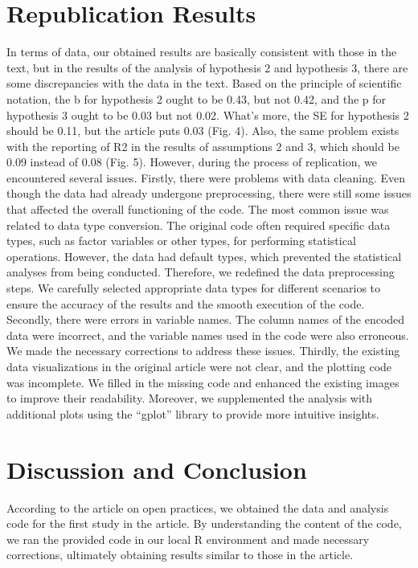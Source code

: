 \documentclass[
  man]{apa6}
\begin{document}
\hypertarget{republication-results}{%
\section{Republication Results}\label{republication-results}}

In terms of data, our obtained results are basically consistent with those in the text, but in the results of the analysis of hypothesis 2 and hypothesis 3, there are some discrepancies with the data in the text. Based on the principle of scientific notation, the b for hypothesis 2 ought to be 0.43, but not 0.42, and the p for hypothesis 3 ought to be 0.03 but not 0.02. What's more, the SE for hypothesis 2 should be 0.11, but the article puts 0.03 (Fig. 4). Also, the same problem exists with the reporting of R2 in the results of assumptions 2 and 3, which should be 0.09 instead of 0.08 (Fig. 5).
However, during the process of replication, we encountered several issues. Firstly, there were problems with data cleaning. Even though the data had already undergone preprocessing, there were still some issues that affected the overall functioning of the code. The most common issue was related to data type conversion. The original code often required specific data types, such as factor variables or other types, for performing statistical operations. However, the data had default types, which prevented the statistical analyses from being conducted. Therefore, we redefined the data preprocessing steps. We carefully selected appropriate data types for different scenarios to ensure the accuracy of the results and the smooth execution of the code.
Secondly, there were errors in variable names. The column names of the encoded data were incorrect, and the variable names used in the code were also erroneous. We made the necessary corrections to address these issues.
Thirdly, the existing data visualizations in the original article were not clear, and the plotting code was incomplete. We filled in the missing code and enhanced the existing images to improve their readability. Moreover, we supplemented the analysis with additional plots using the ``gplot'' library to provide more intuitive insights.

\hypertarget{discussion-and-conclusion}{%
\section{Discussion and Conclusion}\label{discussion-and-conclusion}}

According to the article on open practices, we obtained the data and analysis code for the first study in the article. By understanding the content of the code, we ran the provided code in our local R environment and made necessary corrections, ultimately obtaining results similar to those in the article.
\end{document}
